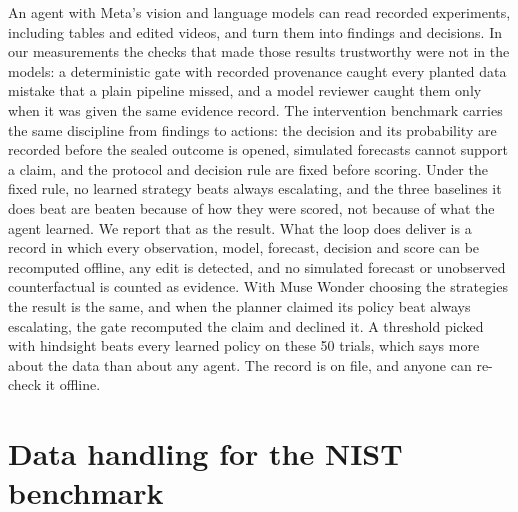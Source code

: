 \documentclass[11pt]{article}
\begin{document}
An agent with Meta's vision and language models can read recorded experiments, including tables and edited videos,
and turn them into findings and decisions. In our measurements the checks that made those results trustworthy were not
in the models: a deterministic gate with recorded provenance caught every planted data mistake that a plain pipeline
missed, and a model reviewer caught them only when it was given the same evidence record. The intervention benchmark
carries the same discipline from findings to actions: the decision and its probability are recorded before the sealed
outcome is opened, simulated forecasts cannot support a claim, and the protocol and decision rule are fixed before
scoring. Under the fixed rule, no learned strategy beats always escalating, and the three baselines it does beat are
beaten because of how they were scored, not because of what the agent learned. We report that as the result. What
the loop does deliver is a record in which every observation, model, forecast, decision and score can be recomputed
offline, any edit is detected, and no simulated forecast or unobserved counterfactual is counted as evidence. With Muse
Wonder choosing the strategies the result is the same, and when the planner claimed its policy beat always
escalating, the gate recomputed the claim and declined it. A threshold picked with hindsight beats every learned
policy on these 50 trials, which says more about the data than about any agent. The record is on file, and anyone
can re-check it offline.




\appendix

\section{Data handling for the NIST benchmark}\label{app:data}
\end{document}
